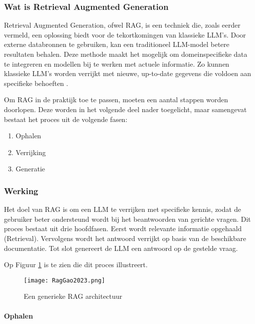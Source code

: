     \subsubsection{Wat is Retrieval Augmented Generation}
    Retrieval Augmented Generation, ofwel RAG, is een techniek die, zoals eerder vermeld, een oplossing biedt voor de tekortkomingen van klassieke LLM’s. Door externe databronnen te gebruiken, kan een traditioneel LLM-model betere resultaten behalen. Deze methode maakt het mogelijk om domeinspecifieke data te integreren en modellen bij te werken met actuele informatie. Zo kunnen klassieke LLM’s worden verrijkt met nieuwe, up-to-date gegevens die voldoen aan specifieke behoeften \autocite{wu2025retrievalaugmentedgenerationnaturallanguage}.
    
    Om RAG in de praktijk toe te passen, moeten een aantal stappen worden doorlopen. Deze worden in het volgende deel nader toegelicht, maar samengevat bestaat het proces uit de volgende fasen:
    
    \begin{enumerate}
        \item {Ophalen}
        \item {Verrijking}
        \item {Generatie}
    \end{enumerate}
    
    \subsubsection{Werking}
    
    Het doel van RAG is om een LLM te verrijken met specifieke kennis, zodat de gebruiker beter ondersteund wordt bij het beantwoorden van gerichte vragen. Dit proces bestaat uit drie hoofdfasen. Eerst wordt relevante informatie opgehaald (Retrieval). Vervolgens wordt het antwoord verrijkt op basis van de beschikbare documentatie. Tot slot genereert de LLM een antwoord op de gestelde vraag.
    
    Op Figuur \ref{fig:Rag process} is te zien die dit proces illustreert.
    
    \begin{figure}[H]
        \centering
        \texttt{[image: RagGao2023.png]}
        \caption{Een generieke RAG architectuur \autocite{gao2024retrievalaugmentedgenerationlargelanguage}}
        \label{fig:Rag process}
    \end{figure}
    
    \paragraph{Ophalen}
     
